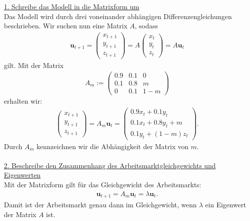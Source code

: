 \underline{1. Schreibe das Modell in die Matrixform um}\\
Das Modell wird durch drei voneinander abhängigen Differenzengleichungen beschrieben. Wir suchen nun eine Matrix $ A $, sodass 
\begin{align*}
	\textbf{u}_{t+1}
	=
	\begin{pmatrix}
		x_{t+1}\\
		y_{t+1}\\
		z_{t+1}
	\end{pmatrix}
	=
	A \begin{pmatrix}
		x_t\\
		y_t\\
		z_t
	\end{pmatrix}
	= A \textbf{u}_t
\end{align*} 
gilt. Mit der Matrix 
\begin{align*}
	A_m
	:= 
	\begin{pmatrix}
		0.9 & 0.1 & 0\\
		0.1 & 0.8 & m\\
		0 & 0.1 & 1-m
	\end{pmatrix}
\end{align*}
erhalten wir:
\begin{align*}
	\begin{pmatrix}
		x_{t+1}\\
		y_{t+1}\\
		z_{t+1}
	\end{pmatrix}
	=
	A_m \textbf{u}_t
	=
	\begin{pmatrix}
		0.9 x_t + 0.1 y_t\\
		0.1 x_t + 0.8 y_t + m\\
		0.1 y_t + (1-m ) z_t
	\end{pmatrix}.
\end{align*}
Durch $ A_m  $ kennzeichnen wir die Abhängigkeit der Matrix von $ m $.\\
\ \\
\underline{2. Beschreibe den Zusammenhang des Arbeitsmarktgleichgewichts und Eigenwerten}\\
Mit der Matrixform gilt für das Gleichgewicht des Arbeitsmarkts:
\begin{align*}
	\textbf{u}_{t+1} = A_m \textbf{u}_{t} = \lambda \textbf{u}_{t}.
\end{align*}
Damit ist der Arbeitsmarkt genau dann im Gleichgewicht, wenn $ \lambda $ ein Eigenwert der Matrix $ A $ ist.\\
\\

